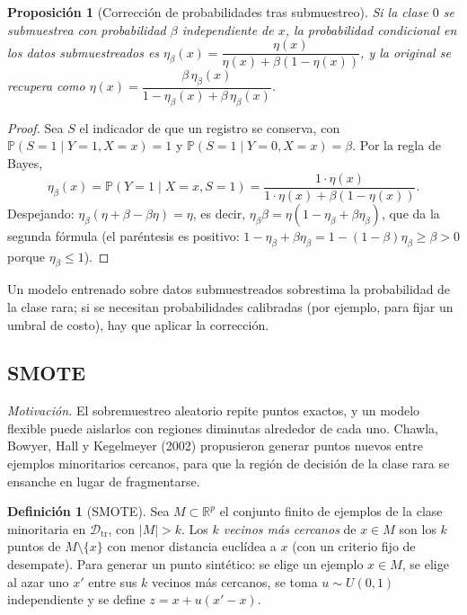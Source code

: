 \documentclass[11pt]{article}
\newtheorem{proposicion}[teorema]{Proposición}
\theoremstyle{definition}
\newtheorem{definicion}[teorema]{Definición}
\theoremstyle{remark}
\newcommand{\R}{\mathbb{R}}
\newcommand{\Prob}{\mathbb{P}}
\newcommand{\abs}[1]{\left\lvert #1\right\rvert}
\newcommand{\Dtr}{\mathcal{D}_{\mathrm{tr}}}
\begin{document}
\begin{proposicion}[Corrección de probabilidades tras submuestreo]\label{prop:correccion}
\noindent Si la clase $0$ se submuestrea con probabilidad $\beta$ independiente de $x$, la probabilidad condicional en los datos submuestreados es $\eta_\beta(x)=\dfrac{\eta(x)}{\eta(x)+\beta(1-\eta(x))}$, y la original se recupera como $\eta(x)=\dfrac{\beta\,\eta_\beta(x)}{1-\eta_\beta(x)+\beta\,\eta_\beta(x)}$.
\end{proposicion}
\begin{proof}
\noindent Sea $S$ el indicador de que un registro se conserva, con $\Prob(S=1\mid Y=1,X=x)=1$ y $\Prob(S=1\mid Y=0,X=x)=\beta$. Por la regla de Bayes,
\[
\eta_\beta(x)=\Prob(Y=1\mid X=x,S=1)=\frac{1\cdot\eta(x)}{1\cdot\eta(x)+\beta(1-\eta(x))}.
\]
Despejando: $\eta_\beta(\eta+\beta-\beta\eta)=\eta$, es decir, $\eta_\beta\beta=\eta(1-\eta_\beta+\beta\eta_\beta)$, que da la segunda fórmula (el paréntesis es positivo: $1-\eta_\beta+\beta\eta_\beta=1-(1-\beta)\eta_\beta\ge\beta>0$ porque $\eta_\beta\le1$).
\end{proof}

\noindent Un modelo entrenado sobre datos submuestreados sobrestima la probabilidad de la clase rara; si se necesitan probabilidades calibradas (por ejemplo, para fijar un umbral de costo), hay que aplicar la corrección.

\subsection{SMOTE}\label{sec:smote}

\noindent \emph{Motivación.} El sobremuestreo aleatorio repite puntos exactos, y un modelo flexible puede aislarlos con regiones diminutas alrededor de cada uno. Chawla, Bowyer, Hall y Kegelmeyer (2002) propusieron generar puntos nuevos entre ejemplos minoritarios cercanos, para que la región de decisión de la clase rara se ensanche en lugar de fragmentarse.

\begin{definicion}[SMOTE]\label{def:smote}
\noindent Sea $M\subset\R^p$ el conjunto finito de ejemplos de la clase minoritaria en $\Dtr$, con $\abs M>k$. Los \emph{$k$ vecinos más cercanos} de $x\in M$ son los $k$ puntos de $M\setminus\{x\}$ con menor distancia euclídea a $x$ (con un criterio fijo de desempate). Para generar un punto sintético: se elige un ejemplo $x\in M$, se elige al azar uno $x'$ entre sus $k$ vecinos más cercanos, se toma $u\sim U(0,1)$ independiente y se define $z=x+u(x'-x)$.
\end{definicion}
\end{document}
